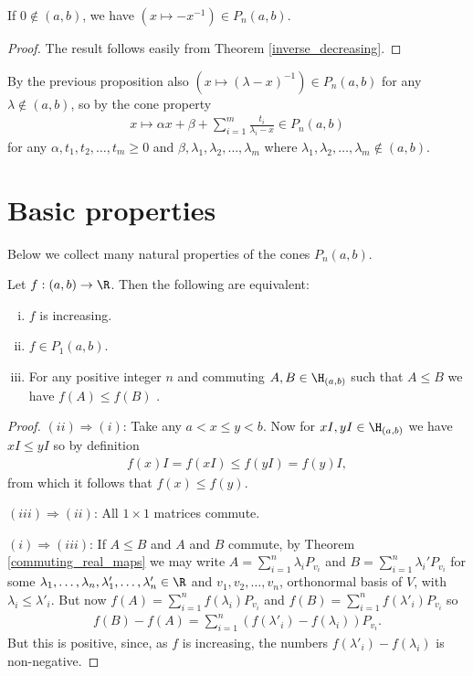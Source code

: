 \begin{prop}
	If $0 \notin (a, b)$, we have $(x \mapsto -x^{-1}) \in P_{n}(a, b)$.
\end{prop}
\begin{proof}
	The result follows easily from Theorem \ref{inverse_decreasing}.
\end{proof}

By the previous proposition also $(x \mapsto (\lambda - x)^{-1}) \in P_{n}(a, b)$ for any $\lambda \notin (a, b)$, so by the cone property
\begin{align}\label{finite_pick}
	x \mapsto \alpha x + \beta + \sum_{i = 1}^{m} \frac{t_{i}}{\lambda_{i} - x} \in P_{n}(a, b)
\end{align}
for any $\alpha, t_{1}, t_{2}, \ldots, t_{m} \geq 0$ and $\beta, \lambda_{1}, \lambda_{2}, \ldots, \lambda_{m}$ where $\lambda_{1}, \lambda_{2}, \ldots, \lambda_{m} \not\in (a, b)$.

\section{Basic properties}

Below we collect many natural properties of the cones $P_{n}(a, b)$.

\begin{prop}
	Let $f : (a, b) \to \R$. Then the following are equivalent:
	\begin{enumerate}[(i)]
		\item $f$ is increasing.
		\item $f \in P_{1}(a, b)$.
		\item For any positive integer $n$ and commuting $A, B \in \H_{(a, b)}$ such that $A \leq B$ we have $f(A) \leq f(B)$ .
	\end{enumerate}
\end{prop}
\begin{proof}
	$(ii) \Rightarrow (i)$: Take any $a < x \leq y < b$. Now for $xI, yI \in \H_{(a, b)}$ we have $x I \leq y I$ so by definition
	\begin{align*}
		f(x) I = f(xI) \leq f(y I) = f(y) I,
	\end{align*}
	from which it follows that $f(x) \leq f(y)$.

	$(iii) \Rightarrow (ii)$: All $1 \times 1$ matrices commute.
	

	$(i) \Rightarrow (iii)$: If $A \leq B$ and $A$ and $B$ commute, by Theorem \ref{commuting_real_maps} we may write $A = \sum_{i = 1}^{n} \lambda_{i} P_{v_{i}}$ and $B = \sum_{i = 1}^{n} \lambda_{i}' P_{v_{i}}$ for some $\lambda_{1}, \ldots, \lambda_{n}, \lambda'_{1}, \ldots, \lambda'_{n} \in \R$ and $v_{1}, v_{2}, \ldots, v_{n}$, orthonormal basis of $V$, with $\lambda_{i} \leq \lambda'_{i}$. But now $f(A) = \sum_{i = 1}^{n} f(\lambda_{i}) P_{v_{i}}$ and $f(B) = \sum_{i = 1}^{n} f(\lambda'_{i}) P_{v_{i}}$ so
	\begin{align*}
		f(B) - f(A) = \sum_{i = 1}^{n} (f(\lambda'_{i}) - f(\lambda_{i})) P_{v_{i}}.
	\end{align*}
	But this is positive, since, as $f$ is increasing, the numbers $f(\lambda'_{i}) - f(\lambda_{i})$ is non-negative.
\end{proof}

